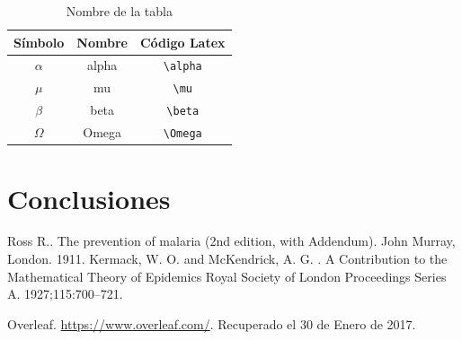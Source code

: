 \documentclass[journal]{IEEEtran}
\begin{document}

\begin{table}[H]
\centering
\caption{Nombre de la tabla}
\label{table1}
\begin{tabular}{c c c}\hline\hline
\textbf{Símbolo} & \textbf{Nombre} & \textbf{Código Latex}\\ \hline
$\alpha$ & alpha & \verb|\alpha| \\
$\mu$ & mu & \verb|\mu|\\
$\beta$ & beta & \verb|\beta|\\
$\Omega$ & Omega & \verb|\Omega| \\\hline \hline
\end{tabular}
\end{table}

\section{Conclusiones}


\ifCLASSOPTIONcaptionsoff
  \newpage
\fi

\begin{thebibliography}{1}

	Ross R.. The prevention of malaria (2nd edition, with Addendum). John Murray, London. 1911.
  Kermack, W. O. and McKendrick, A. G. . A Contribution to the Mathematical Theory of Epidemics
Royal Society of London Proceedings Series A. 1927;115:700–721.

Overleaf. \url{https://www.overleaf.com/}. Recuperado el 30 de Enero de 2017.

\end{thebibliography}
\end{document}
